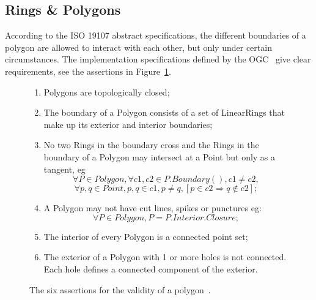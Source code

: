 \documentclass[a4paper,parskip=half,11pt]{scrartcl}
\newcommand{\eg}{eg}
\begin{document}
\subsection{Rings \& Polygons}

According to the ISO 19107 abstract specifications, the different boundaries of a polygon are allowed to interact with each other, but only under certain circumstances.
The implementation specifications defined by the OGC~\citep{OGC-SF} give clear requirements, see the assertions in Figure~\ref{fig:ogcsf_definitions}.
\begin{figure}
  \centering
\begin{boxedminipage}{.9\textwidth}
  {\small
\begin{enumerate}
  \item Polygons are topologically closed;
  \item The boundary of a Polygon consists of a set of LinearRings that make up its exterior and interior boundaries;
  \item No two Rings in the boundary cross and the Rings in the boundary of a Polygon may intersect at a Point but only as a tangent, \eg\ 
    \[
       \forall P \in Polygon, \forall c1, c2 \in P.Boundary(), c1 \neq c2,
    \]
    \[
        \forall p, q \in Point, p, q \in c1, p \neq q, [p \in c2 \Rightarrow q \notin c2];
    \]
  \item A Polygon may not have cut lines, spikes or punctures \eg:
    \[
       \forall P \in Polygon, P = P.Interior.Closure;
    \]
  \item The interior of every Polygon is a connected point set;
  \item The exterior of a Polygon with 1 or more holes is not connected. Each hole defines a connected component of the exterior.
\end{enumerate}
}
\end{boxedminipage}
\caption{The six assertions for the validity of a polygon~\citep[pages 26--27]{OGC-SF}.}\label{fig:ogcsf_definitions}
\end{figure}
\end{document}
